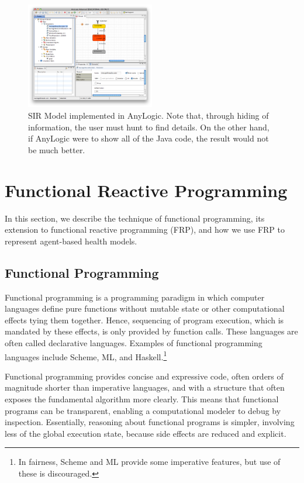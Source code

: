 \documentclass{sig-alternate}
\begin{document}
\begin{figure}[h]
\includegraphics[width=0.5\textwidth]{sir_anylogic.png}
\caption{SIR Model implemented in AnyLogic. Note that, through hiding of information, the user must hunt to find details. On the other hand, if AnyLogic were to show all of the Java code, the result would not be much better. \label{fig:sir_anylogic}}
\end{figure}


\section{Functional Reactive Programming}

In this section, we describe the technique of functional programming, its extension to functional reactive programming (FRP), and how we use FRP to represent agent-based health models.

\subsection{Functional Programming}

Functional programming is a programming paradigm in which computer languages define pure functions without mutable state or other computational effects tying them together.  Hence, sequencing of program execution, which is mandated by these effects, is only provided by function calls. These languages are often called declarative languages.  Examples of functional programming languages include Scheme, ML, and Haskell.\footnote{In fairness, Scheme and ML provide some imperative features, but use of these is discouraged.}

Functional programming provides concise and expressive code, often orders of magnitude shorter than imperative languages, and with a structure that often exposes the fundamental algorithm more clearly.  This means that functional programs can be transparent, enabling a computational modeler to debug by inspection.  Essentially, reasoning about functional programs is simpler, involving less of the global execution state, because side effects are reduced and explicit.
\end{document}
